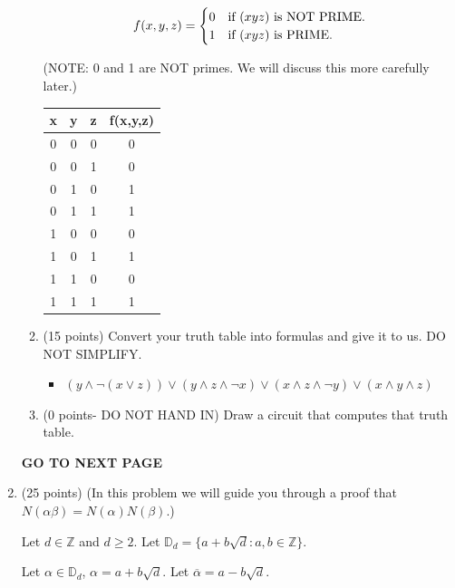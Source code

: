 \documentclass[12pt]{article}
\newcommand{\D}{{\mathbb D}}
\newcommand{\Z}{{\mathbb Z}}
\begin{document}
\begin{enumerate}
\begin{enumerate}
\begin{equation*}
f(x,y,z) = 
\begin{cases}
0  & \hbox{if $(xyz)$ is NOT PRIME.} \cr
1  & \hbox{if $(xyz)$ is PRIME.} \cr
\end{cases}
\end{equation*} 

(NOTE: 0 and 1 are NOT primes. We will discuss this more carefully later.) 
\begin{center}
    \begin{tabular}{|c|c|c|c|}
     \hline
     \textbf{x}& \textbf{y} & \textbf{z}& \textbf{f(x,y,z)} \\
     \hline
     0 & 0 & 0 & 0 \\ 
     0 & 0 & 1 & 0 \\ 
     0 & 1 & 0 & 1 \\ 
     0 & 1 & 1 & 1 \\ 
     1 & 0 & 0 & 0 \\
     1 & 0 & 1 & 1 \\ 
     1 & 1 & 0 & 0 \\ 
     1 & 1 & 1 & 1 \\ 
     \hline
    \end{tabular}
\end{center}

\item
(15 points) 
Convert your truth table into formulas and give it to us. 
DO NOT SIMPLIFY.
\begin{itemize}
    \item \boldmath $(y \wedge \neg(x \vee z)) \vee (y \wedge z \wedge \neg x) \vee (x \wedge z \wedge \neg y) \vee (x \wedge y \wedge z)$ 
\end{itemize}

\item
(0 points- DO NOT HAND IN)
Draw a circuit that computes that truth table. 
\end{enumerate}

\vfill

\centerline{\bf GO TO NEXT PAGE}

\newpage

\item
(25 points)
(In this problem we will guide you through a proof that $N(\alpha\beta)=N(\alpha)N(\beta)$.)

\newcommand{\ov}[1]{\overline{#1}}

Let $d\in\Z$ and $d\ge 2$. Let $\D_d = \{ a+b\sqrt{d} \colon a,b\in\Z\}$. 

Let $\alpha\in \D_d$, $\alpha = a+b\sqrt{d}$. Let $\ov \alpha = a-b\sqrt{d}$. 


\end{enumerate}
\end{document}
